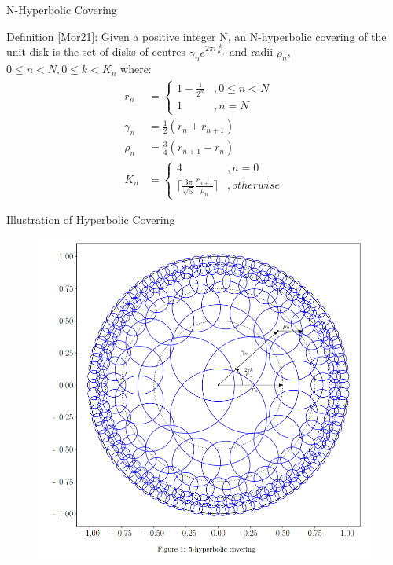 \begin{frame}{N-Hyperbolic Covering}
    \begin{block}
        {Definition}
        [Mor21]: Given a positive integer N, an N-hyperbolic covering of the unit disk is the set of disks of centres $\gamma_n e^{2 \pi i \frac{k}{K_n}}$ and radii $\rho_n$, $0 \le n < N, 0 \le k < K_n$ where:
        \begin{align*}
            r_n &= \begin{cases}
                1 - \frac{1}{2^n} &, 0 \le n < N \\
                1 &, n = N
            \end{cases} \\
            \gamma_n &= \frac{1}{2}(r_n + r_{n+1}) \\
            \rho_n &= \frac{3}{4}(r_{n+1} - r_n) \\
            K_n &= \begin{cases}
                4 &, n = 0 \\
                \lceil \frac{3 \pi}{\sqrt{5}} \frac{r_{n+1}}{\rho_n} \rceil&, otherwise
            \end{cases}
        \end{align*}
    \end{block}
\end{frame}

\begin{frame}{Illustration of Hyperbolic Covering}
    \begin{figure}
        \centering
        \includegraphics[scale=0.25]{Project Files/hyperbolic-cover.png}
        \label{fig:enter-label}
    \end{figure}

    \blfootnote{[Mor21]}
\end{frame}

